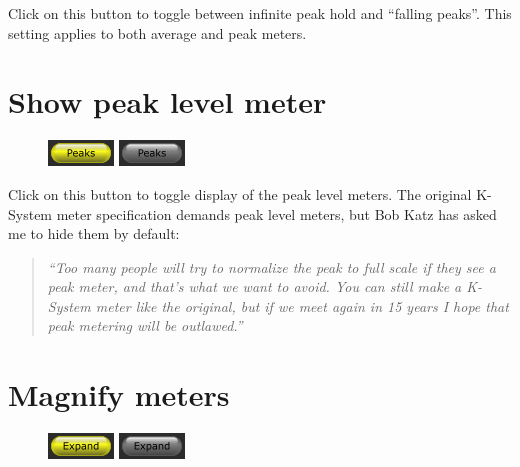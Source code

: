 Click on this button to toggle between infinite peak hold and
``falling peaks''.  This setting applies to both average and peak
meters.

\section{Show peak level meter}

\begin{figure}
  \includegraphics[scale=\screenshotscale,clip]{include/images/button_peak_meter_on.png}
  \newline \vspace{-0.9\baselineskip}
  \includegraphics[scale=\screenshotscale,clip]{include/images/button_peak_meter_off.png}
\end{figure}

Click on this button to toggle display of the peak level meters.  The
original K-System meter specification demands peak level meters, but
Bob Katz has asked me to hide them by default:

\begin{quotation}
  \emph{``Too many people will try to normalize the peak to full scale
    if they see a peak meter, and that's what we want to avoid.  You
    can still make a K-System meter like the original, but if we meet
    again in \num{15} years I hope that peak metering will be
    outlawed.''}
\end{quotation}

\section{Magnify meters}

\begin{figure}
  \includegraphics[scale=\screenshotscale,clip]{include/images/button_expand_meter_on.png}
  \newline \vspace{-0.9\baselineskip}
  \includegraphics[scale=\screenshotscale,clip]{include/images/button_expand_meter_off.png}
\end{figure}

